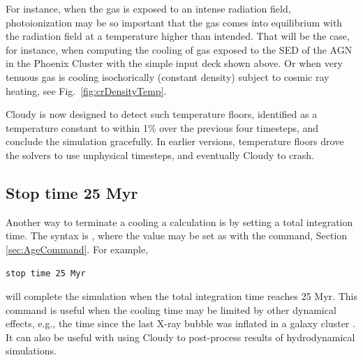 For instance, when the gas is exposed to an intense radiation field,
photoionization may be so important that the gas comes into equilibrium with
the radiation field at a temperature higher than intended. 
That will be the case, for instance, when computing the cooling of gas exposed
to the SED of the AGN in the Phoenix Cluster \citep{Reefe2025} with the simple
input deck shown above.
Or when very tenuous gas is cooling isochorically (constant density) subject to
cosmic ray heating, see Fig.~\ref{fig:crDensityTemp}.

Cloudy is now designed to detect such temperature floors, identified as a
temperature constant to within 1\% over the previous four timesteps, and
conclude the simulation gracefully.
In earlier versions, temperature floors drove the solvers to use unphysical
timesteps, and eventually Cloudy to crash.


\subsection{Stop time 25 Myr}
\label{sec:StopTime}

Another way to terminate a cooling a calculation is by setting a total
integration time.
The syntax is , where the value may be set as
with the  command, Section \ref{sec:AgeCommand}.
For example,
%
\begin{verbatim}
stop time 25 Myr
\end{verbatim}
%
will complete the simulation when the total integration time reaches 25 Myr.
This command is useful when the cooling time may be limited by other dynamical
effects, e.g., the time since the last X-ray bubble was inflated in a galaxy
cluster \citep[e.g.,][]{Reefe2025}.
It can also be useful with using Cloudy to post-process results of
hydrodynamical simulations.


